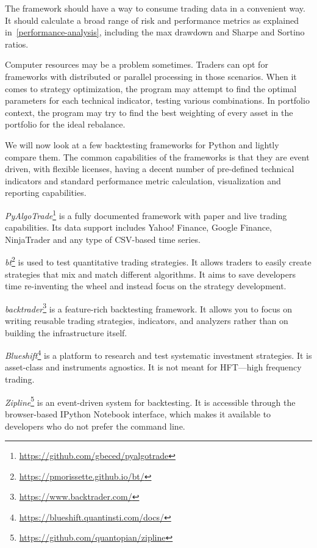 The framework should have a way to consume trading data in a convenient way. It should calculate a broad range of risk and performance metrics as explained in~\ref{performance-analysis}, including the max drawdown and Sharpe and Sortino ratios.

Computer resources may be a problem sometimes. Traders can opt for frameworks with distributed or parallel processing in those scenarios. When it comes to strategy optimization, the program may attempt to find the optimal parameters for each technical indicator, testing various combinations. In portfolio context, the program may try to find the best weighting of every asset in the portfolio for the ideal rebalance.

We will now look at a few backtesting frameworks for Python and lightly compare them. The common capabilities of the frameworks is that they are event driven, with flexible licenses, having a decent number of pre-defined technical indicators and standard performance metric calculation, visualization and reporting capabilities.

\emph{PyAlgoTrade}\footnote{\url{https://github.com/gbeced/pyalgotrade}} is a fully documented framework with paper and live trading capabilities. Its data support includes Yahoo! Finance, Google Finance, NinjaTrader and any type of CSV-based time series.

\emph{bt}\footnote{\url{https://pmorissette.github.io/bt/}} is used to test quantitative trading strategies. It allows traders to easily create strategies that mix and match different algorithms. It aims to save developers time re-inventing the wheel and instead focus on the strategy development.

\emph{backtrader}\footnote{\url{https://www.backtrader.com/}} is a feature-rich backtesting framework. It allows you to focus on writing reusable trading strategies, indicators, and analyzers rather than on building the infrastructure itself.

\emph{Blueshift}\footnote{\url{https://blueshift.quantinsti.com/docs/}} is a platform to research and test systematic investment strategies. It is asset-class and instruments agnostics. It is not meant for HFT---high frequency trading.

\emph{Zipline}\footnote{\url{https://github.com/quantopian/zipline}} is an event-driven system for backtesting. It is accessible through the browser-based IPython Notebook interface, which makes it available to developers who do not prefer the command line.


